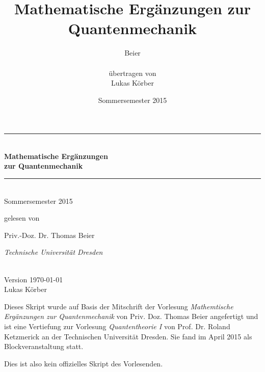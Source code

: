 \documentclass[a4paper,12pt,portrait]{book}
\title{Mathematische Erg\"anzungen zur Quantenmechanik}
\author{Beier\\ \\ \"ubertragen von\\Lukas K\"orber}
\date{Sommersemester 2015}
\numberwithin{equation}{section}
\begin{document}
\begin{titlepage}
	\centering %
	\vspace*{\baselineskip} %
	
	\rule{\textwidth}{1.6pt}\\[\baselineskip] %
	
	{\LARGE\bfseries Mathematische Ergänzungen \\[0.3\baselineskip] zur Quantenmechanik}\\[0.8\baselineskip] %
	
	\rule{\textwidth}{1.6pt}\\[\baselineskip] %
	
	Sommersemester 2015\par %
	
	\vspace*{2\baselineskip} %
	
	gelesen von\\[\baselineskip]
	{\Large Priv.-Doz. Dr. Thomas Beier\\[0.3\baselineskip]\par} %
	{\itshape Technische Universität Dresden\par} %
	
	\vfill %
	
	\ \\[0.3\baselineskip] %
	{ Version \today} \\[0.3\baselineskip] %
	{\large Lukas Körber}\par %
\end{titlepage}

Dieses Skript wurde auf Basis der Mitschrift der Vorlesung \textit{Mathemtische Ergänzungen zur Quantenmechanik} von Priv. Doz. Thomas Beier angefertigt und ist eine Vertiefung zur Vorlesung \textit{Quantentheorie I} von Prof. Dr. Roland Ketzmerick an der Technischen Universität Dresden. Sie fand im April 2015 als Blockveranstaltung statt.

Dies ist also kein offizielles Skript des Vorlesenden. 
\tableofcontents
\end{document}
